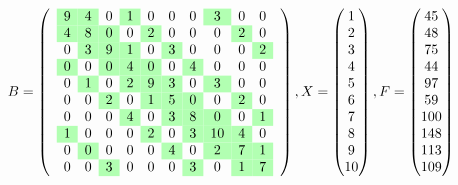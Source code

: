$$ B=\left(\quad\begin{matrix}
\cellcolor{green!30}9 & \cellcolor{green!30}4 & 0 & \cellcolor{green!30}1 & 0 & 0 & 0 & \cellcolor{green!30}3 & 0 & 0 \\
\cellcolor{green!30}4 & \cellcolor{green!30}8 & \cellcolor{green!30}0 & 0 & \cellcolor{green!30}2 & 0 & 0 & 0 & \cellcolor{green!30}2 & 0 \\
0 & \cellcolor{green!30}3 & \cellcolor{green!30}9 & \cellcolor{green!30}1 & 0 & \cellcolor{green!30}3 & 0 & 0 & 0 & \cellcolor{green!30}2 \\
\cellcolor{green!30}0 & 0 & \cellcolor{green!30}0 & \cellcolor{green!30}4 & \cellcolor{green!30}0 & 0 & \cellcolor{green!30}4 & 0 & 0 & 0 \\
0 & \cellcolor{green!30}1 & 0 & \cellcolor{green!30}2 & \cellcolor{green!30}9 & \cellcolor{green!30}3 & 0 & \cellcolor{green!30}3 & 0 & 0 \\
0 & 0 & \cellcolor{green!30}2 & 0 & \cellcolor{green!30}1 & \cellcolor{green!30}5 & \cellcolor{green!30}0 & 0 & \cellcolor{green!30}2 & 0 \\
0 & 0 & 0 & \cellcolor{green!30}4 & 0 & \cellcolor{green!30}3 & \cellcolor{green!30}8 & \cellcolor{green!30}0 & 0 & \cellcolor{green!30}1 \\
\cellcolor{green!30}1 & 0 & 0 & 0 & \cellcolor{green!30}2 & 0 & \cellcolor{green!30}3 & \cellcolor{green!30}10 & \cellcolor{green!30}4 & 0 \\
0 & \cellcolor{green!30}0 & 0 & 0 & 0 & \cellcolor{green!30}4 & 0 & \cellcolor{green!30}2 & \cellcolor{green!30}7 & \cellcolor{green!30}1 \\
0 & 0 & \cellcolor{green!30}3 & 0 & 0 & 0 & \cellcolor{green!30}3 & 0 & \cellcolor{green!30}1 & \cellcolor{green!30}7 
\end{matrix}\quad\right), X=\begin{pmatrix}1 \\
2 \\
3 \\
4 \\
5 \\
6 \\
7 \\
8 \\
9 \\
10 
\end{pmatrix}, F=\begin{pmatrix}45 \\
48 \\
75 \\
44 \\
97 \\
59 \\
100 \\
148 \\
113 \\
109 
\end{pmatrix} $$

